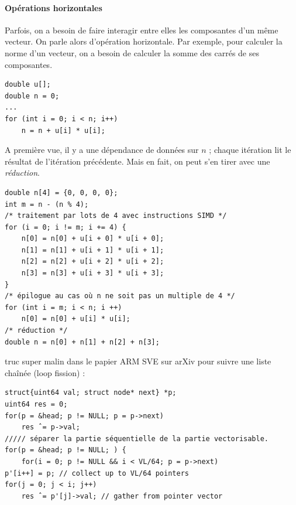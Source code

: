 
\paragraph{Opérations \og horizontales\fg}

Parfois, on a besoin de faire interagir entre elles les composantes d'un même
vecteur. On parle alors d'opération \og horizontale\fg. Par exemple, pour
calculer la norme d'un vecteur, on a besoin de calculer la somme des carrés de
ses composantes.

\begin{verbatim}
double u[];
double n = 0;
...
for (int i = 0; i < n; i++)
    n = n + u[i] * u[i];
\end{verbatim}
A première vue, il y a une dépendance de données sur $n$ ; chaque itération lit
le résultat de l'itération précédente. Mais en fait, on peut s'en tirer avec une
\emph{réduction}.

\begin{verbatim}
double n[4] = {0, 0, 0, 0};
int m = n - (n % 4);
/* traitement par lots de 4 avec instructions SIMD */
for (i = 0; i != m; i += 4) {
    n[0] = n[0] + u[i + 0] * u[i + 0];
    n[1] = n[1] + u[i + 1] * u[i + 1];
    n[2] = n[2] + u[i + 2] * u[i + 2];
    n[3] = n[3] + u[i + 3] * u[i + 3];
}
/* épilogue au cas où n ne soit pas un multiple de 4 */
for (int i = m; i < n; i ++)
    n[0] = n[0] + u[i] * u[i];
/* réduction */
double n = n[0] + n[1] + n[2] + n[3];
\end{verbatim}

truc super malin dans le papier ARM SVE sur arXiv pour suivre une liste chaînée (loop fission) :
\begin{verbatim}
struct{uint64 val; struct node* next} *p;
uint64 res = 0;
for(p = &head; p != NULL; p = p->next)
    res ˆ= p->val;
///// séparer la partie séquentielle de la partie vectorisable.
for(p = &head; p != NULL; ) {
    for(i = 0; p != NULL && i < VL/64; p = p->next)
p'[i++] = p; // collect up to VL/64 pointers
for(j = 0; j < i; j++)
    res ˆ= p'[j]->val; // gather from pointer vector
\end{verbatim}




